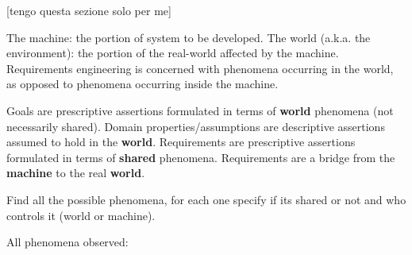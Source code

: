 [tengo questa sezione solo per me]

The machine: the portion of system to be developed.
The world (a.k.a. the environment): the portion of the real-world affected by the machine.
Requirements engineering is concerned with phenomena occurring in the world, as opposed to phenomena occurring inside the machine.

Goals are prescriptive assertions formulated in terms of \textbf{world} phenomena (not necessarily shared).
Domain properties/assumptions are descriptive assertions assumed to hold in the \textbf{world}.
Requirements are prescriptive assertions formulated in terms of \textbf{shared} phenomena.
Requirements are a bridge from the \textbf{machine} to the real \textbf{world}.

Find all the possible phenomena, for each one specify if its shared or not and who controls it (world or machine). 

All phenomena observed:

